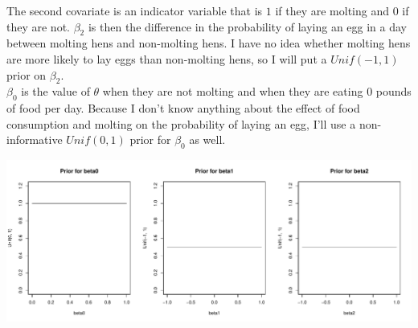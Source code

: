 \documentclass[11pt]{article}\usepackage[]{graphicx}\usepackage[]{color}
\newenvironment{knitrout}{}{} %
\begin{document}
\begin{doublespacing}
\begin{enumerate}
\begin{enumerate}
The second covariate is an indicator variable that is $1$ if they are molting and $0$ if they are not. $\beta_2$ is then the difference in the probability of laying an egg in a day between molting hens and non-molting hens. I have no idea whether molting hens are more likely to lay eggs than non-molting hens, so I will put a $Unif(-1, 1)$ prior on $\beta_2$. \\



$\beta_0$ is the value of $\theta$ when they are not molting and when they are eating $0$ pounds of food per day. Because I don't know anything about the effect of food consumption and molting on the probability of laying an egg, I'll use a non-informative $Unif(0,1)$ prior for $\beta_0$ as well.

\begin{knitrout}\footnotesize
{}\color{fgcolor}
\includegraphics[width=\linewidth]{figure/plotprs-1} 

\end{knitrout}


\end{enumerate}

\end{enumerate}

\end{doublespacing}
\end{document}
